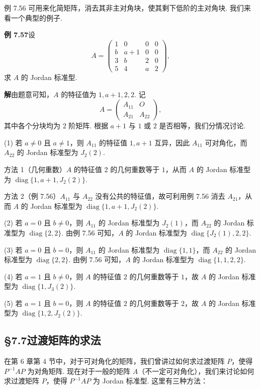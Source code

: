 \documentclass[UTF8, 12pt, fontset=fandol, oneside]{ctexart}
\begin{document}
例 7.56 可用来化简矩阵，消去其非主对角块，使其剩下低阶的主对角块. 我们来看一个典型的例子.

\noindent\textbf{例 7.57}\quad 设
\[
A=\left(\begin{array}{cccc}
1&0&0&0\\
b&a+1&0&0\\
3&b&2&0\\
5&4&a&2
\end{array}\right),
\]
求 $A$ 的 Jordan 标准型.

\noindent\textbf{解}\quad 由题意可知，$A$ 的特征值为 $1,a+1,2,2$. 记
\[
A=\left(\begin{array}{cc}A_{11}&O\\A_{21}&A_{22}\end{array}\right),
\]
其中各个分块均为 $2$ 阶矩阵. 根据 $a+1$ 与 $1$ 或 $2$ 是否相等，我们分情况讨论.

(1) 若 $a\ne0$ 且 $a\ne1$，则 $A_{11}$ 的特征值 $1,a+1$ 互异，因此 $A_{11}$ 可对角化，而 $A_{22}$ 的 Jordan 标准型为 $J_2(2)$.

方法 1（几何重数）\quad $A$ 的特征值 $2$ 的几何重数等于 $1$，从而 $A$ 的 Jordan 标准型为 $\operatorname{diag}\{1,a+1,J_2(2)\}$.

方法 2（例 7.56）\quad $A_{11}$ 与 $A_{22}$ 没有公共的特征值，故可利用例 7.56 消去 $A_{21}$，从而 $A$ 的 Jordan 标准型为 $\operatorname{diag}\{1,a+1,J_2(2)\}$.

(2) 若 $a=0$ 且 $b\ne0$，则 $A_{11}$ 的 Jordan 标准型为 $J_2(1)$，而 $A_{22}$ 的 Jordan 标准型为 $\operatorname{diag}\{2,2\}$. 由例 7.56 可知，$A$ 的 Jordan 标准型为 $\operatorname{diag}\{J_2(1),2,2\}$.

(3) 若 $a=0$ 且 $b=0$，则 $A_{11}$ 的 Jordan 标准型为 $\operatorname{diag}\{1,1\}$，而 $A_{22}$ 的 Jordan 标准型为 $\operatorname{diag}\{2,2\}$. 由例 7.56 可知，$A$ 的 Jordan 标准型为 $\operatorname{diag}\{1,1,2,2\}$.

(4) 若 $a=1$ 且 $b\ne0$，则 $A$ 的特征值 $2$ 的几何重数等于 $1$，故 $A$ 的 Jordan 标准型为 $\operatorname{diag}\{1,J_3(2)\}$.

(5) 若 $a=1$ 且 $b=0$，则 $A$ 的特征值 $2$ 的几何重数等于 $2$，故 $A$ 的 Jordan 标准型为 $\operatorname{diag}\{1,2,J_2(2)\}$.

\subsection*{§7.7\quad 过渡矩阵的求法}

在第 6 章第 4 节中，对于可对角化的矩阵，我们曾讲过如何求过渡矩阵 $P$，使得 $P^{-1}AP$ 为对角矩阵. 现在对于一般的矩阵 $A$（不一定可对角化），我们来讨论如何求过渡矩阵 $P$，使得 $P^{-1}AP$ 为 Jordan 标准型. 这里有三种方法：
\end{document}
